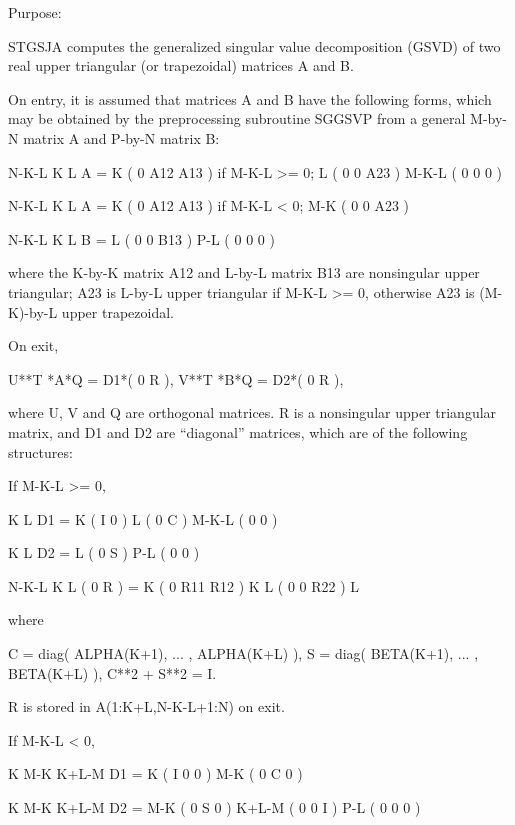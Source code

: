  \begin{DoxyParagraph}{Purpose\+: }
\begin{DoxyVerb} STGSJA computes the generalized singular value decomposition (GSVD)
 of two real upper triangular (or trapezoidal) matrices A and B.

 On entry, it is assumed that matrices A and B have the following
 forms, which may be obtained by the preprocessing subroutine SGGSVP
 from a general M-by-N matrix A and P-by-N matrix B:

              N-K-L  K    L
    A =    K ( 0    A12  A13 ) if M-K-L >= 0;
           L ( 0     0   A23 )
       M-K-L ( 0     0    0  )

            N-K-L  K    L
    A =  K ( 0    A12  A13 ) if M-K-L < 0;
       M-K ( 0     0   A23 )

            N-K-L  K    L
    B =  L ( 0     0   B13 )
       P-L ( 0     0    0  )

 where the K-by-K matrix A12 and L-by-L matrix B13 are nonsingular
 upper triangular; A23 is L-by-L upper triangular if M-K-L >= 0,
 otherwise A23 is (M-K)-by-L upper trapezoidal.

 On exit,

        U**T *A*Q = D1*( 0 R ),    V**T *B*Q = D2*( 0 R ),

 where U, V and Q are orthogonal matrices.
 R is a nonsingular upper triangular matrix, and D1 and D2 are
 ``diagonal'' matrices, which are of the following structures:

 If M-K-L >= 0,

                     K  L
        D1 =     K ( I  0 )
                 L ( 0  C )
             M-K-L ( 0  0 )

                   K  L
        D2 = L   ( 0  S )
             P-L ( 0  0 )

                N-K-L  K    L
   ( 0 R ) = K (  0   R11  R12 ) K
             L (  0    0   R22 ) L

 where

   C = diag( ALPHA(K+1), ... , ALPHA(K+L) ),
   S = diag( BETA(K+1),  ... , BETA(K+L) ),
   C**2 + S**2 = I.

   R is stored in A(1:K+L,N-K-L+1:N) on exit.

 If M-K-L < 0,

                K M-K K+L-M
     D1 =   K ( I  0    0   )
          M-K ( 0  C    0   )

                  K M-K K+L-M
     D2 =   M-K ( 0  S    0   )
          K+L-M ( 0  0    I   )
            P-L ( 0  0    0   )


\end{DoxyVerb}
\end{DoxyParagraph}
